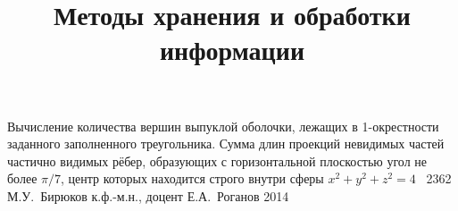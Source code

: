 \documentclass[a4paper,12pt]{memoir}
\begin{document}
\renewcommand{\contentsname}{{\Large{Содержание}\hfill}}

\title{Методы хранения и обработки информации}
{Вычисление количества вершин выпуклой оболочки, лежащих в 1-окрестности заданного заполненного треугольника. 
Сумма длин проекций невидимых частей частично видимых рёбер, образующих с горизонтальной плоскостью угол не более $\pi/7$,  
центр которых находится строго внутри сферы  $x^2+y^2+z^2=4$~}
{2362}
{М.\+У.~Бирюков}
{к.ф.-м.н., доцент}
{Е.\+А.~Роганов}
{2014}





\newpage
\end{document}
